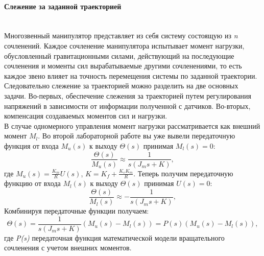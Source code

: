 \paragraph*{Слежение за заданной траекторией}\\
Многозвенный манипулятор представляет из себя систему состоящую из \textit{n} сочленений. Каждое сочленение манипулятора испытывает момент нагрузки, обусловленный гравитационными силами, действующий на последующие сочленения и моменты сил вырабатываемые другими сочленениями, то есть каждое звено влияет на точность перемещения системы по заданной траектории. Следовательно слежение за траекторией можно разделить на две основных задачи. Во-первых, обеспечение слежения за траекторией путем регулирования напряжений в зависимости от информации полученной с датчиков. Во-вторых, компенсация создаваемых моментов сил и нагрузки.\\

В случае одномерного управления момент нагрузки рассматривается как внешний момент $M_l$.
Во второй лабораторной работе вы уже вывели передаточную функция от входа $M_u(s)$ к выходу $ \Theta(s)$ принимая $M_l(s)=0$:\\
$$\frac{\Theta(s)}{M_u(s)}\approx \frac{1}{s(J_ms+K)},$$
где $M_u(s) = \frac{K_m}{R}U(s)$, $K=K_f + \frac{K_eK_m}{R}$. Теперь получим передаточную функцию от входа $M_l(s)$ к выходу $ \Theta(s)$ принимая $U(s)=0$:\\
$$\frac{\Theta(s)}{M_l(s)}\approx -\frac{1}{s(J_ms+K)},$$
Комбинируя передаточные функции получаем:\\
$$\Theta(s) = \frac{1}{s(J_ms + K)}(M_u(s)-M_l(s)) = P(s)(M_u(s) - M_l(s)),$$
где \textit{P(s)} передаточная функция математической модели вращательного сочленения с учетом внешних моментов.\\

